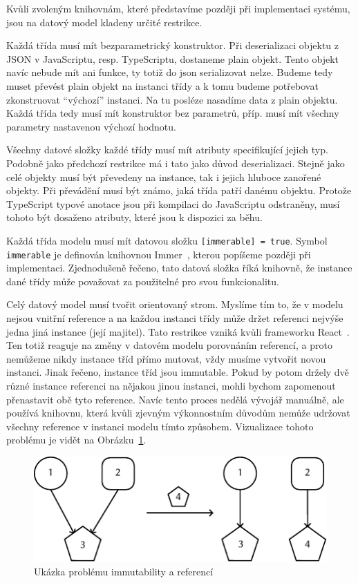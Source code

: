 Kvůli zvoleným knihovnám, které představíme později při implementaci systému, jsou na datový model kladeny určité restrikce.

Každá třída musí mít bezparametrický konstruktor.
Při deserializaci objektu z JSON v JavaScriptu, resp. TypeScriptu, dostaneme plain objekt.
Tento objekt navíc nebude mít ani funkce, ty totiž do \acrshort{json} serializovat nelze.
Budeme tedy muset převést plain objekt na instanci třídy a k tomu budeme potřebovat zkonstruovat \enquote{výchozí} instanci.
Na tu posléze nasadíme data z plain objektu.
Každá třída tedy musí mít konstruktor bez parametrů, příp. musí mít všechny parametry nastavenou výchozí hodnotu.

Všechny datové složky každé třídy musí mít atributy specifikující jejich typ.
Podobně jako předchozí restrikce má i tato jako důvod deserializaci.
Stejně jako celé objekty musí být převedeny na instance, tak i jejich hluboce zanořené objekty.
Při převádění musí být známo, jaká třída patří danému objektu.
Protože TypeScript typové anotace jsou při kompilaci do JavaScriptu odstraněny, musí tohoto být dosaženo atributy, které jsou k dispozici za běhu.

Každá třída modelu musí mít datovou složku \texttt{[immerable] = true}.
Symbol \texttt{immerable} je definován knihovnou Immer~\cite{michelweststrate_immer_2023}, kterou popíšeme později při implementaci.
Zjednodušeně řečeno, tato datová složka říká knihovně, že instance dané třídy může považovat za použitelné pro svou funkcionalitu.

Celý datový model musí tvořit orientovaný strom.
Myslíme tím to, že v modelu nejsou vnitřní reference a na každou instanci třídy může držet referenci nejvýše jedna jiná instance (její majitel).
Tato restrikce vzniká kvůli frameworku React~\cite{react_2023}.
Ten totiž reaguje na změny v datovém modelu porovnáním referencí, a proto nemůžeme nikdy instance tříd přímo mutovat, vždy musíme vytvořit novou instanci.
Jinak řečeno, instance tříd jsou immutable.
Pokud by potom držely dvě různé instance referenci na nějakou jinou instanci, mohli bychom zapomenout přenastavit obě tyto reference.
Navíc tento proces nedělá vývojář manuálně, ale používá knihovnu, která kvůli zjevným výkonnostním důvodům nemůže udržovat všechny reference v instanci modelu tímto způsobem.
Vizualizace tohoto problému je vidět na Obrázku~\ref{fig:immutability-references}.

\begin{figure}[!htb]
  \centering
  \includegraphics[width=\maxwidth{\textwidth}]{../img/react-references.pdf}
  \caption{Ukázka problému immutability a referencí}
  \label{fig:immutability-references}
\end{figure}

